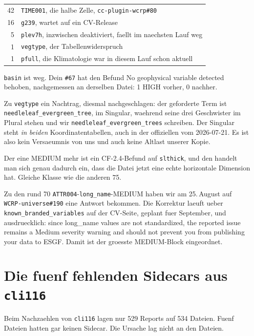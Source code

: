 \documentclass[11pt,a4paper]{article}
\newcommand{\code}[1]{\texttt{\small #1}}
\begin{document}
\begin{center}
\begin{tabular}{rl}
\toprule
42 & \code{TIME001}, die halbe Zelle, \code{cc-plugin-wcrp\#80} \\
16 & \code{g239}, wartet auf ein CV-Release \\
 5 & \code{plev7h}, inzwischen deaktiviert, faellt im naechsten Lauf weg \\
 1 & \code{vegtype}, der Tabellenwiderspruch \\
 1 & \code{pfull}, die Klimatologie war in diesem Lauf schon aktuell \\
\bottomrule
\end{tabular}
\end{center}

\code{basin} ist weg. Dein \code{\#67} hat den Befund
\glqq No geophysical variable detected\grqq{} behoben, nachgemessen an derselben
Datei: 1 HIGH vorher, 0 nachher.

Zu \code{vegtype} ein Nachtrag, diesmal nachgeschlagen: der
geforderte Term ist \code{needleleaf\_evergreen\_tree}, im Singular, waehrend seine
drei Geschwister im Plural stehen und wir \code{needleleaf\_evergreen\_trees}
schreiben. Der Singular steht \emph{in beiden} Koordinatentabellen, auch in der
offiziellen vom 2026-07-21. Es ist also kein Versaeumnis von uns und auch keine
Altlast unserer Kopie.

Der eine MEDIUM mehr ist ein CF-2.4-Befund auf \code{slthick}, und den handelt man
sich genau dadurch ein, dass die Datei jetzt eine echte horizontale Dimension hat.
Gleiche Klasse wie die anderen 75.

Zu den rund 70 \code{ATTR004}-\code{long\_name}-MEDIUM haben wir am 25.\,August
auf \code{WCRP-universe\#190} eine Antwort bekommen. Die Korrektur laeuft ueber
\code{known\_branded\_variables} auf der CV-Seite, geplant fuer September, und
ausdruecklich: \glqq since long\_name values are not standardized, the reported
issue remains a Medium severity warning and should not prevent you from publishing
your data to ESGF\grqq{}. Damit ist der groesste MEDIUM-Block eingeordnet.

\section{Die fuenf fehlenden Sidecars aus \code{cli116}}

Beim Nachzaehlen von \code{cli116} lagen nur 529 Reports auf 534 Dateien. Fuenf
Dateien hatten gar keinen Sidecar. Die Ursache lag nicht an den Dateien.
\end{document}
